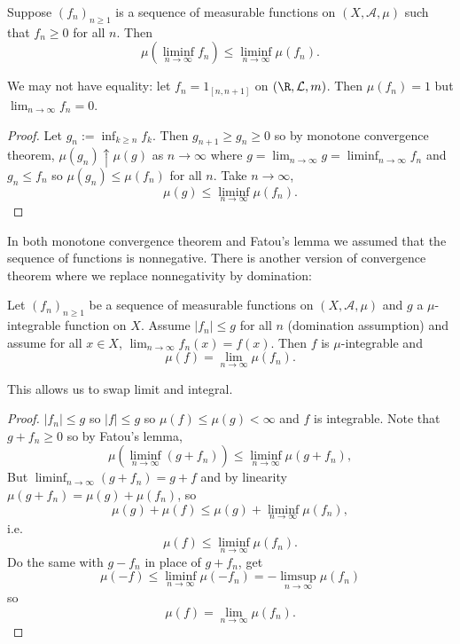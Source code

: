 \documentclass[a4paper]{article}
\begin{document}
\begin{lemma}
  Suppose \((f_n)_{n \geq 1}\) is a sequence of measurable functions on \((X, \mathcal A, \mu)\) such that \(f_n \geq 0\) for all \(n\). Then
  \[
    \mu(\liminf_{n \to \infty} f_n) \leq \liminf_{n \to \infty} \mu(f_n).
  \]
\end{lemma}

\begin{remark}
  We may not have equality: let \(f_n = 1_{[n, n + 1]}\) on \((\R, \mathcal L, m)\). Then \(\mu(f_n) = 1\) but \(\lim_{n \to \infty} f_n = 0\).
\end{remark}

\begin{proof}
  Let \(g_n := \inf_{k \geq n} f_k\). Then \(g_{n + 1} \geq g_n \geq 0\) so by monotone convergence theorem, \(\mu(g_n) \uparrow \mu(g)\) as \(n \to \infty\) where \(g = \lim_{n \to \infty} g = \liminf_{n \to \infty} f_n\) and \(g_n \leq f_n\) so \(\mu(g_n) \leq \mu(f_n)\) for all \(n\). Take \(n \to \infty\),
  \[
    \mu(g) \leq \liminf_{n \to \infty} \mu(f_n).
  \]
\end{proof}

In both monotone convergence theorem and Fatou's lemma we assumed that the sequence of functions is nonnegative. There is another version of convergence theorem where we replace nonnegativity by domination:

\begin{theorem}
  Let \((f_n)_{n \geq 1}\) be a sequence of measurable functions on \((X, \mathcal A, \mu)\) and \(g\) a \(\mu\)-integrable function on \(X\). Assume \(|f_n| \leq g\) for all \(n\) (domination assumption) and assume for all \(x \in X\), \(\lim_{n \to \infty} f_n(x) = f(x)\). Then \(f\) is \(\mu\)-integrable and
  \[
    \mu(f) = \lim_{n \to \infty} \mu(f_n).
  \]
\end{theorem}

This allows us to swap limit and integral.

\begin{proof}
  \(|f_n| \leq g\) so \(|f| \leq g\) so \(\mu(f) \leq \mu(g) < \infty\) and \(f\) is integrable. Note that \(g + f_n \geq 0\) so by Fatou's lemma,
  \[
    \mu(\liminf_{n \to \infty} (g + f_n)) \leq \liminf_{n \to \infty} \mu(g + f_n),
  \]
  But \(\liminf_{n \to \infty} (g + f_n) = g + f\) and by linearity \(\mu(g + f_n) = \mu(g) + \mu(f_n)\), so
  \[
    \mu(g) + \mu(f) \leq \mu(g) + \liminf_{n \to \infty} \mu(f_n),
  \]
  i.e.
  \[
    \mu(f) \leq \liminf_{n \to \infty} \mu(f_n).
  \]
  Do the same with \(g - f_n\) in place of \(g + f_n\), get
  \[
    \mu(-f) \leq \liminf_{n \to \infty} \mu(-f_n) = - \limsup_{n \to \infty} \mu(f_n)
  \]
  so
  \[
    \mu(f) = \lim_{n \to \infty} \mu(f_n).
  \]
\end{proof}
\end{document}
